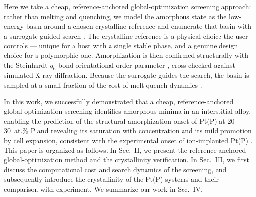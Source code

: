 Here we take a cheap, reference-anchored global-optimization screening
approach: rather than melting and quenching, we model the amorphous state as
the low-energy basin around a chosen crystalline reference and enumerate that
basin with a surrogate-guided search
\cite{gofee2020,gofee2022,agox2022}. The crystalline reference is a physical
choice the user controls --- unique for a host with a single stable phase, and
a genuine design choice for a polymorphic one. Amorphization is then confirmed
structurally with the Steinhardt $q_6$ bond-orientational order parameter
\cite{steinhardt1983}, cross-checked against simulated X-ray diffraction.
Because the surrogate guides the search, the basin is sampled at a small
fraction of the cost of melt-quench dynamics \cite{artrith2018}.

In this work, we successfully demonstrated that a cheap, reference-anchored
global-optimization screening identifies amorphous minima in an interstitial
alloy, enabling the prediction of the structural amorphization onset of Pt(P)
at 20--30~at.\% P and revealing its saturation with concentration and its mild
promotion by cell expansion, consistent with the experimental onset of
ion-implanted Pt(P) \cite{shashank2025}. This paper is organized as follows.
In Sec.~II, we present the reference-anchored global-optimization method and
the crystallinity verification. In Sec.~III, we first discuss the
computational cost and search dynamics of the screening, and subsequently
introduce the crystallinity of the Pt(P) systems and their comparison with
experiment. We summarize our work in Sec.~IV.
